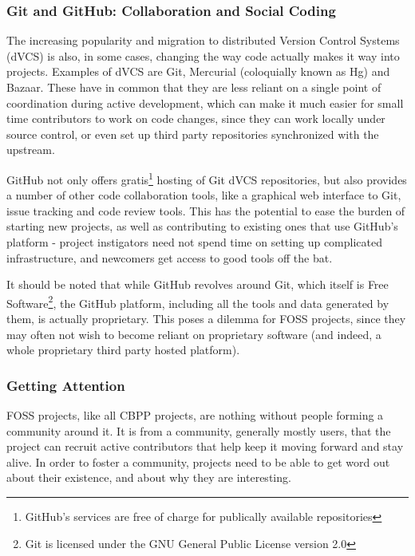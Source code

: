 \documentclass[a4paper,11pt]{article} %
\begin{document}
\subsubsection{Git and GitHub: Collaboration and Social Coding}
The increasing popularity and migration to distributed Version Control
Systems (dVCS) is also, in some cases, changing the way code actually
makes it way into projects. Examples of dVCS are Git, Mercurial
(coloquially known as Hg) and Bazaar. These have in common that they
are less reliant on a single point of coordination during active
development, which can make it much easier for small time contributors
to work on code changes, since they can work locally under source
control, or even set up third party repositories synchronized with the
upstream.

GitHub not only offers gratis\footnote{GitHub's services are free of
  charge for publically available repositories} hosting of Git dVCS
repositories, but also provides a number of other code collaboration
tools, like a graphical web interface to Git, issue tracking and code
review tools. This has the potential to ease the burden of starting
new projects, as well as contributing to existing ones that use
GitHub's platform - project instigators need not spend time on setting
up complicated infrastructure, and newcomers get access to good tools
off the bat.

It should be noted that while GitHub revolves around Git, which itself
is Free Software\footnote{Git is licensed under the GNU General Public
  License version 2.0}, the GitHub platform, including all the tools
and data generated by them, is actually proprietary. This poses a
dilemma for FOSS projects, since they may often not wish to become
reliant on proprietary software (and indeed, a whole proprietary third
party hosted platform).


\subsubsection{Getting Attention}
FOSS projects, like all CBPP projects, are nothing without people
forming a community around it. It is from a community, generally
mostly users, that the project can recruit active contributors that
help keep it moving forward and stay alive. In order to foster a
community, projects need to be able to get word out about their
existence, and about why they are interesting.
\end{document}
